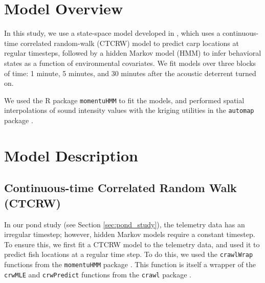 \documentclass[12pt]{article}
\begin{document}
	\section{Model Overview}
	
	In this study, we use a state-space model developed in \cite{Johnson2008, McClintock2012, Michelot2016, Whoriskey2017, McClintock2018}, which uses a continuous-time correlated random-walk (CTCRW) model to predict carp locations at regular timesteps, followed by a hidden Markov model (HMM) to infer behavioral states as a function of environmental covariates. We fit models over three blocks of time: 1 minute, 5 minutes, and 30 minutes after the acoustic deterrent turned on.
	
	We used the R package \texttt{momentuHMM} \cite{McClintock2018} to fit the models, and performed spatial interpolations of sound intensity values with the kriging utilities in the \texttt{automap} package  \cite{Hiemstra2008}.
	
	\section{Model Description}
	
	\subsection{Continuous-time Correlated Random Walk (CTCRW)}
	
	In our pond study (see Section \ref{sec:pond_study}), the telemetry data has an irregular timestep; however, hidden Markov models require a constant timestep. To ensure this, we first fit a CTCRW model to the telemetry data, and used it to predict fish locations at a regular time step. To do this, we used the \texttt{crawlWrap} functions from the \texttt{momentuHMM} package \cite{McClintock2018}. This function is itself a wrapper of the \texttt{crwMLE} and \texttt{crwPredict} functions from the \texttt{crawl} package \cite{crawl}.
	
\end{document}

